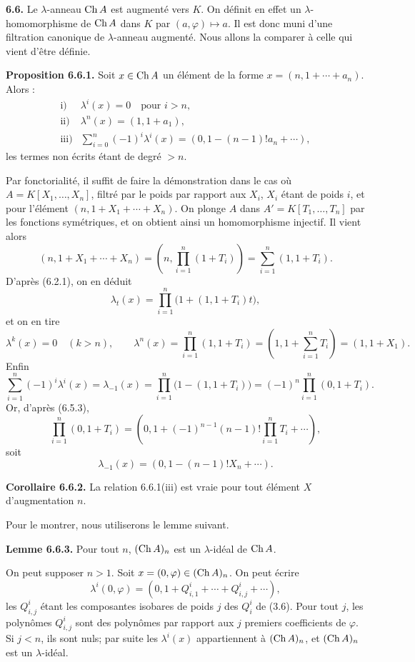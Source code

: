 \documentclass[11pt]{article}
\begin{document}
\textbf{6.6.} Le \(\lambda\)-anneau \(\operatorname{Ch} A\) est augmenté vers \(K\). On définit en effet un \(\lambda\)-homomorphisme de \(\operatorname{Ch} A\) dans \(K\) par \((a,\varphi)\mapsto a\). Il est donc muni d'une filtration canonique de \(\lambda\)-anneau augmenté. Nous allons la comparer à celle qui vient d'être définie.

\textbf{Proposition 6.6.1.} Soit \(x\in\operatorname{Ch} A\) un élément de la forme \(x=(n,1+\cdots+a_n)\). Alors :
\[
\begin{array}{ll}
\text{i)}& \lambda^i(x)=0\quad\text{pour }i>n,\\[0.3em]
\text{ii)}& \lambda^n(x)=(1,1+a_1),\\[0.3em]
\text{iii)}& \displaystyle\sum_{i=0}^n(-1)^i\lambda^i(x)
       =(0,1-(n-1)!a_n+\cdots),
\end{array}
\]
les termes non écrits étant de degré \(>n\).

Par fonctorialité, il suffit de faire la démonstration dans le cas où \(A=K[X_1,\ldots,X_n]\), filtré par le poids par rapport aux \(X_i\), \(X_i\) étant de poids \(i\), et pour l'élément \((n,1+X_1+\cdots+X_n)\). On plonge \(A\) dans \(A'=K[T_1,\ldots,T_n]\) par les fonctions symétriques, et on obtient ainsi un homomorphisme injectif. Il vient alors
\[
 (n,1+X_1+\cdots+X_n)
 =
 \left(n,\prod_{i=1}^n(1+T_i)\right)
 =
 \sum_{i=1}^n(1,1+T_i).
\]
D'après (6.2.1), on en déduit
\[
  \lambda_t(x)=\prod_{i=1}^n\bigl(1+(1,1+T_i)t\bigr),
\]
et on en tire
\[
  \lambda^k(x)=0\quad(k>n),\qquad
  \lambda^n(x)=\prod_{i=1}^n(1,1+T_i)
   =\left(1,1+\sum_{i=1}^nT_i\right)=(1,1+X_1).
\]
Enfin
\[
  \sum_{i=1}^n(-1)^i\lambda^i(x)=\lambda_{-1}(x)
  =
  \prod_{i=1}^n\bigl(1-(1,1+T_i)\bigr)
  =
  (-1)^n\prod_{i=1}^n(0,1+T_i).
\]
Or, d'après (6.5.3),
\[
  \prod_{i=1}^n(0,1+T_i)
  =
  \left(0,1+(-1)^{n-1}(n-1)!\prod_{i=1}^nT_i+\cdots\right),
\]
soit
\[
  \lambda_{-1}(x)=(0,1-(n-1)!X_n+\cdots).
\]

\textbf{Corollaire 6.6.2.} La relation 6.6.1(iii) est vraie pour tout élément \(X\) d'augmentation \(n\).

Pour le montrer, nous utiliserons le lemme suivant.

\textbf{Lemme 6.6.3.} Pour tout \(n\), \((\operatorname{Ch} A)_n\) est un \(\lambda\)-idéal de \(\operatorname{Ch} A\).

On peut supposer \(n>1\). Soit \(x=(0,\varphi)\in(\operatorname{Ch} A)_n\). On peut écrire
\[
  \lambda^i(0,\varphi)=(0,1+Q^i_{i,1}+\cdots+Q^i_{i,j}+\cdots),
\]
les \(Q^i_{i,j}\) étant les composantes isobares de poids \(j\) des \(Q^i_i\) de (3.6). Pour tout \(j\), les polynômes \(Q^i_{i,j}\) sont des polynômes par rapport aux \(j\) premiers coefficients de \(\varphi\). Si \(j<n\), ils sont nuls; par suite les \(\lambda^i(x)\) appartiennent à \((\operatorname{Ch} A)_n\), et \((\operatorname{Ch} A)_n\) est un \(\lambda\)-idéal.
\end{document}
